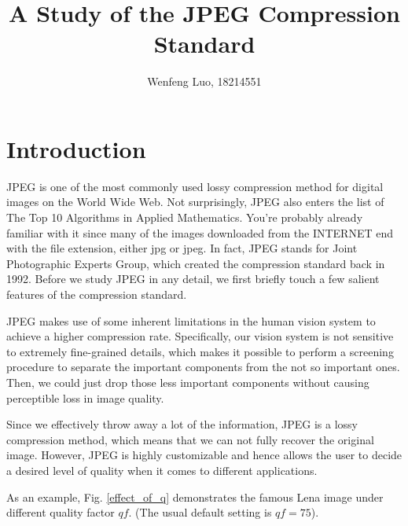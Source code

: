 \documentclass[11pt]{article}
\title{A Study of the JPEG Compression Standard}
\author{Wenfeng Luo, 18214551}
\date{}
\begin{document}
\maketitle

\section{Introduction}
JPEG is one of the most commonly used lossy compression method for digital images on the World Wide Web. Not surprisingly, JPEG also enters the list of The Top 10 Algorithms \cite{c04} in Applied Mathematics. You're probably already familiar with it since many of the images downloaded from the INTERNET end with the file extension, either jpg or jpeg. In fact, JPEG stands for Joint Photographic Experts Group, which created the compression standard back in 1992. Before we study JPEG in any detail, we first briefly touch a few salient features of the compression standard.

JPEG makes use of some inherent limitations in the human vision system to achieve a higher compression rate. Specifically, our vision system is not sensitive to extremely fine-grained details, which makes it possible to perform a screening procedure to separate the important components from the not so important ones. Then, we could just drop those less important components without causing perceptible loss in image quality.

Since we effectively throw away a lot of the information, JPEG is a lossy compression method, which means that we can not fully recover the original image. However, JPEG is highly customizable and hence allows the user to decide a desired level of quality when it comes to different applications.

As an example, Fig. \ref{effect_of_q} demonstrates the famous Lena image under different quality factor $qf$. (The usual default setting is $qf=75$). 
\end{document}
